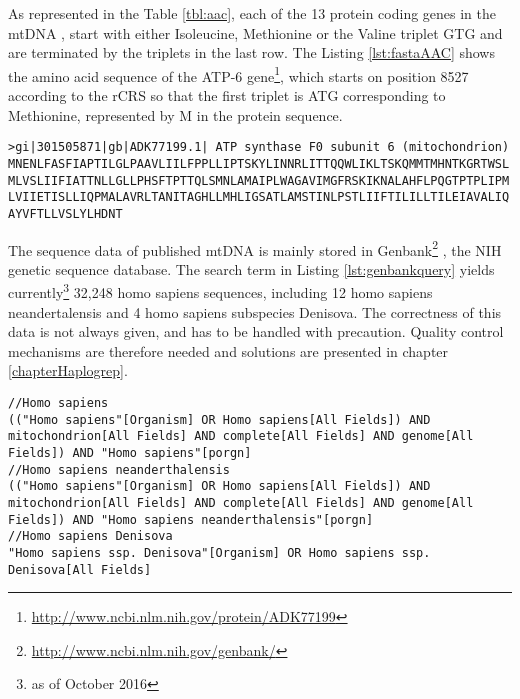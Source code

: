 As represented in the Table \ref{tbl:aac}, each of the 13 protein coding genes in the mtDNA \cite{Bandelt2006}, start with either Isoleucine, Methionine or the Valine triplet GTG and are terminated by the triplets in the last row. The Listing \ref{lst:fastaAAC} shows the amino acid sequence of the ATP-6 gene\footnote{\url{http://www.ncbi.nlm.nih.gov/protein/ADK77199}}, which starts on position 8527 according to the rCRS so that the first triplet is ATG corresponding to Methionine, represented by M in the protein sequence.
{\small 
\begin{lstlisting}[caption= {Example of a FASTA protein sequence - here the complete ATP-6 gene}, label={lst:fastaAAC}]
>gi|301505871|gb|ADK77199.1| ATP synthase F0 subunit 6 (mitochondrion)
MNENLFASFIAPTILGLPAAVLIILFPPLLIPTSKYLINNRLITTQQWLIKLTSKQMMTMHNTKGRTWSL
MLVSLIIFIATTNLLGLLPHSFTPTTQLSMNLAMAIPLWAGAVIMGFRSKIKNALAHFLPQGTPTPLIPM
LVIIETISLLIQPMALAVRLTANITAGHLLMHLIGSATLAMSTINLPSTLIIFTILILLTILEIAVALIQ
AYVFTLLVSLYLHDNT
\end{lstlisting}
}
The sequence data of published mtDNA is mainly stored in Genbank\footnote{\url{http://www.ncbi.nlm.nih.gov/genbank/}} \cite{Benson2005}, the NIH genetic sequence database. The search term in Listing \ref{lst:genbankquery} yields currently\footnote{as of October 2016} 32,248 homo sapiens sequences, including 12 homo sapiens neandertalensis and 4 homo sapiens subspecies Denisova. 
The correctness of this data is not always given, and has to be handled with precaution. Quality control mechanisms are therefore needed and solutions are presented in chapter \ref{chapterHaplogrep}. 
\begin{lstlisting}[caption={GenBank queries for mtDNA sequences}, label={lst:genbankquery}]
//Homo sapiens
(("Homo sapiens"[Organism] OR Homo sapiens[All Fields]) AND mitochondrion[All Fields] AND complete[All Fields] AND genome[All Fields]) AND "Homo sapiens"[porgn]
//Homo sapiens neanderthalensis
(("Homo sapiens"[Organism] OR Homo sapiens[All Fields]) AND mitochondrion[All Fields] AND complete[All Fields] AND genome[All Fields]) AND "Homo sapiens neanderthalensis"[porgn] 
//Homo sapiens Denisova
"Homo sapiens ssp. Denisova"[Organism] OR Homo sapiens ssp. Denisova[All Fields]
\end{lstlisting}
